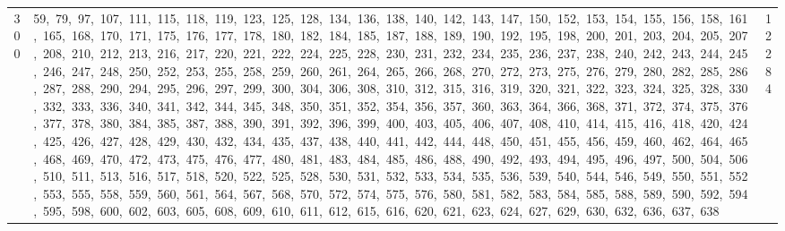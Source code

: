 \begin{longtable}{c|p{}|r}
300 & 59,\ 79,\ 97,\ 107,\ 111,\ 115,\ 118,\ 119,\ 123,\ 125,\ 128,\ 134,\ 136,\ 138,\ 140,\ 142,\ 143,\ 147,\ 150,\ 152,\ 153,\ 154,\ 155,\ 156,\ 158,\ 161,\ 165,\ 168,\ 170,\ 171,\ 175,\ 176,\ 177,\ 178,\ 180,\ 182,\ 184,\ 185,\ 187,\ 188,\ 189,\ 190,\ 192,\ 195,\ 198,\ 200,\ 201,\ 203,\ 204,\ 205,\ 207,\ 208,\ 210,\ 212,\ 213,\ 216,\ 217,\ 220,\ 221,\ 222,\ 224,\ 225,\ 228,\ 230,\ 231,\ 232,\ 234,\ 235,\ 236,\ 237,\ 238,\ 240,\ 242,\ 243,\ 244,\ 245,\ 246,\ 247,\ 248,\ 250,\ 252,\ 253,\ 255,\ 258,\ 259,\ 260,\ 261,\ 264,\ 265,\ 266,\ 268,\ 270,\ 272,\ 273,\ 275,\ 276,\ 279,\ 280,\ 282,\ 285,\ 286,\ 287,\ 288,\ 290,\ 294,\ 295,\ 296,\ 297,\ 299,\ 300,\ 304,\ 306,\ 308,\ 310,\ 312,\ 315,\ 316,\ 319,\ 320,\ 321,\ 322,\ 323,\ 324,\ 325,\ 328,\ 330,\ 332,\ 333,\ 336,\ 340,\ 341,\ 342,\ 344,\ 345,\ 348,\ 350,\ 351,\ 352,\ 354,\ 356,\ 357,\ 360,\ 363,\ 364,\ 366,\ 368,\ 371,\ 372,\ 374,\ 375,\ 376,\ 377,\ 378,\ 380,\ 384,\ 385,\ 387,\ 388,\ 390,\ 391,\ 392,\ 396,\ 399,\ 400,\ 403,\ 405,\ 406,\ 407,\ 408,\ 410,\ 414,\ 415,\ 416,\ 418,\ 420,\ 424,\ 425,\ 426,\ 427,\ 428,\ 429,\ 430,\ 432,\ 434,\ 435,\ 437,\ 438,\ 440,\ 441,\ 442,\ 444,\ 448,\ 450,\ 451,\ 455,\ 456,\ 459,\ 460,\ 462,\ 464,\ 465,\ 468,\ 469,\ 470,\ 472,\ 473,\ 475,\ 476,\ 477,\ 480,\ 481,\ 483,\ 484,\ 485,\ 486,\ 488,\ 490,\ 492,\ 493,\ 494,\ 495,\ 496,\ 497,\ 500,\ 504,\ 506,\ 510,\ 511,\ 513,\ 516,\ 517,\ 518,\ 520,\ 522,\ 525,\ 528,\ 530,\ 531,\ 532,\ 533,\ 534,\ 535,\ 536,\ 539,\ 540,\ 544,\ 546,\ 549,\ 550,\ 551,\ 552,\ 553,\ 555,\ 558,\ 559,\ 560,\ 561,\ 564,\ 567,\ 568,\ 570,\ 572,\ 574,\ 575,\ 576,\ 580,\ 581,\ 582,\ 583,\ 584,\ 585,\ 588,\ 589,\ 590,\ 592,\ 594,\ 595,\ 598,\ 600,\ 602,\ 603,\ 605,\ 608,\ 609,\ 610,\ 611,\ 612,\ 615,\ 616,\ 620,\ 621,\ 623,\ 624,\ 627,\ 629,\ 630,\ 632,\ 636,\ 637,\ 638 & 12284 \\

\end{longtable}

